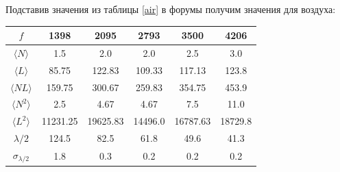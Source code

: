 \documentclass[a4paper,12pt]{article}
\begin{document}
\begin{enumerate}
\begin{enumerate}
Подставив значения из таблицы \ref{air} в форумы получим значения для воздуха:


\begin{center}
\begin{tabular}{|c|c|c|c|c|c|}
\hline 
$f$ & 1398 & 2095 & 2793 & 3500 & 4206 \\ 
\hline 
$\langle N \rangle$ & 1.5 & 2.0 & 2.0 & 2.5 & 3.0 \\ 
\hline 
$\langle L \rangle$ & 85.75 & 122.83 & 109.33 & 117.13 & 123.8 \\ 
\hline 
$\langle NL \rangle$ & 159.75 & 300.67 & 259.83 & 354.75 & 453.9 \\ 
\hline 
$\langle N^2 \rangle$ & 2.5 & 4.67 & 4.67 & 7.5 & 11.0 \\ 
\hline 
$\langle L^2 \rangle$ & 11231.25 & 19625.83 & 14496.0 & 16787.63 & 18729.8 \\ 
\hline 
$\lambda/2$ & 124.5 & 82.5 & 61.8 & 49.6 & 41.3 \\ 
\hline 
$\sigma_{\lambda/2}$ & 1.8 & 0.3 & 0.2 & 0.2 & 0.2 \\ 
\hline 
\end{tabular} 
\end{center}



\end{enumerate}
\end{enumerate}
\end{document}
